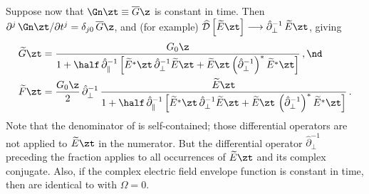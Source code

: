 Suppose now that $\Gn\zt \equiv \overline{G}\z$ is constant in time. Then $\partial^j\, \Gn\zt / \partial t^j = \delta_{j 0}\, \overline{G}\z$, and (for example) $\widehat{\mathcal{D}}\left[\widetilde{E}\zt\right] \longrightarrow \hat{\partial}_\perp^{-1}\, \widetilde{E}\zt$, giving
\begin{subequations} \label{eqn:mfl_formal_fg_const_pump}
    \begin{align}
        \label{eqn:mfl_formal_g_const_pump}
        \widetilde{G}\zt &= \frac{G_0\z}{1 + \half\, \hat{\partial}_\parallel^{-1} \left[ \widetilde{E}^\ast\zt\, \hat{\partial}_\perp^{-1} \widetilde{E}\zt + \widetilde{E}\zt \left(\hat{\partial}_\perp^{-1}\right)^\ast \widetilde{E}^\ast\zt\right] }\, , \nd \\
        \label{eqn:mfl_formal_f_const_pump}
        \widetilde{F}\zt &= \frac{G_0\z}{2}\, \hat{\partial}_\perp^{-1}\, \frac{\widetilde{E}\zt}{1 + \half\, \hat{\partial}_\parallel^{-1} \left[ \widetilde{E}^\ast\zt\, \hat{\partial}_\perp^{-1} \widetilde{E}\zt + \widetilde{E}\zt\, \left(\hat{\partial}_\perp^{-1}\right)^\ast \widetilde{E}^\ast\zt\right] }\, .    
    \end{align}
\end{subequations}
Note that the denominator of  is self-contained; those differential operators are not applied to $\widetilde{E}\zt$ in the numerator. But the differential operator $\hat{\partial}_\perp^{-1}$ preceding the fraction applies to all occurrences of $\widetilde{E}\zt$ and its complex conjugate. Also, if the complex electric field envelope function is constant in time, then  are identical to  with $\Omega = 0$.


